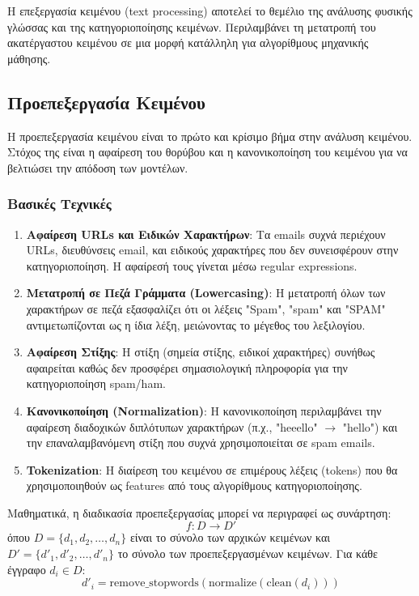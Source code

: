 \documentclass[12pt,a4paper,twoside]{book}
\begin{document}
Η επεξεργασία κειμένου (text processing) αποτελεί το θεμέλιο της ανάλυσης φυσικής γλώσσας και της κατηγοριοποίησης κειμένων. Περιλαμβάνει τη μετατροπή του ακατέργαστου κειμένου σε μια μορφή κατάλληλη για αλγορίθμους μηχανικής μάθησης.

\subsection{Προεπεξεργασία Κειμένου}

Η προεπεξεργασία κειμένου είναι το πρώτο και κρίσιμο βήμα στην ανάλυση κειμένου. Στόχος της είναι η αφαίρεση του θορύβου και η κανονικοποίηση του κειμένου για να βελτιώσει την απόδοση των μοντέλων.

\subsubsection{Βασικές Τεχνικές}

\begin{enumerate}
    \item \textbf{Αφαίρεση URLs και Ειδικών Χαρακτήρων}: Τα emails συχνά περιέχουν URLs, διευθύνσεις email, και ειδικούς χαρακτήρες που δεν συνεισφέρουν στην κατηγοριοποίηση. Η αφαίρεσή τους γίνεται μέσω regular expressions.

    \item \textbf{Μετατροπή σε Πεζά Γράμματα (Lowercasing)}: Η μετατροπή όλων των χαρακτήρων σε πεζά εξασφαλίζει ότι οι λέξεις "Spam", "spam" και "SPAM" αντιμετωπίζονται ως η ίδια λέξη, μειώνοντας το μέγεθος του λεξιλογίου.

    \item \textbf{Αφαίρεση Στίξης}: Η στίξη (σημεία στίξης, ειδικοί χαρακτήρες) συνήθως αφαιρείται καθώς δεν προσφέρει σημασιολογική πληροφορία για την κατηγοριοποίηση spam/ham.

    \item \textbf{Κανονικοποίηση (Normalization)}: Η κανονικοποίηση περιλαμβάνει την αφαίρεση διαδοχικών διπλότυπων χαρακτήρων (π.χ., "heeello" \(\rightarrow\) "hello") και την επαναλαμβανόμενη στίξη που συχνά χρησιμοποιείται σε spam emails.

    \item \textbf{Tokenization}: Η διαίρεση του κειμένου σε επιμέρους λέξεις (tokens) που θα χρησιμοποιηθούν ως features από τους αλγορίθμους κατηγοριοποίησης.
\end{enumerate}

Μαθηματικά, η διαδικασία προεπεξεργασίας μπορεί να περιγραφεί ως συνάρτηση:
\begin{equation}
    f: D \rightarrow D'
\end{equation}
όπου \(D = \{d_1, d_2, \ldots, d_n\}\) είναι το σύνολο των αρχικών κειμένων και \(D' = \{d'_1, d'_2, \ldots, d'_n\}\) το σύνολο των προεπεξεργασμένων κειμένων. Για κάθε έγγραφο \(d_i \in D\):
\begin{equation}
    d'_i = \text{remove\_stopwords}(\text{normalize}(\text{clean}(d_i)))
\end{equation}
\end{document}
